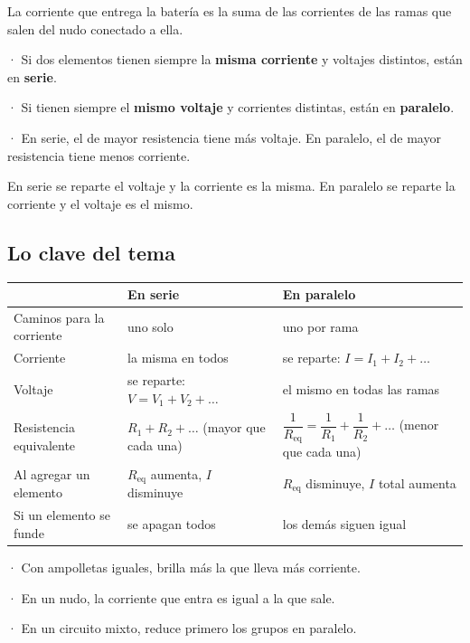 La corriente que entrega la batería es la suma de las corrientes de las ramas que salen del nudo conectado a ella.

  
\begin{clave} · Si dos elementos tienen siempre la \textbf{misma corriente} y voltajes distintos, están en \textbf{serie}.\par · Si tienen siempre el \textbf{mismo voltaje} y corrientes distintas, están en \textbf{paralelo}.\par · En serie, el de mayor resistencia tiene más voltaje. En paralelo, el de mayor resistencia tiene menos corriente.\end{clave}
 
\begin{clave}[{Recuerda}] En serie se reparte el voltaje y la corriente es la misma. En paralelo se reparte la corriente y el voltaje es el mismo.\end{clave}
\subsection{Lo clave del tema}
\begin{center}\small
\begin{tabularx}{\linewidth}{@{}>{\raggedright\arraybackslash\hsize=0.82\hsize}X>{\raggedright\arraybackslash\hsize=0.99\hsize}X>{\raggedright\arraybackslash\hsize=1.19\hsize}X@{}}
\toprule
 & \textbf{En serie} & \textbf{En paralelo} \\
\midrule
Caminos para la corriente & uno solo & uno por rama \\
Corriente & la misma en todos & se reparte: $I = I_1 + I_2 + \dots$ \\
Voltaje & se reparte: $V = V_1 + V_2 + \dots$ & el mismo en todas las ramas \\
Resistencia equivalente & $R_1 + R_2 + \dots$ (mayor que cada una) & $\dfrac{1}{R_{\text{eq}}} = \dfrac{1}{R_1} + \dfrac{1}{R_2} + \dots$ (menor que cada una) \\
Al agregar un elemento & $R_{\text{eq}}$ aumenta, $I$ disminuye & $R_{\text{eq}}$ disminuye, $I$ total aumenta \\
Si un elemento se funde & se apagan todos & los demás siguen igual \\
\bottomrule
\end{tabularx}
\end{center}
 
\begin{clave}[{Recuerda}] · Con ampolletas iguales, brilla más la que lleva más corriente.\par · En un nudo, la corriente que entra es igual a la que sale.\par · En un circuito mixto, reduce primero los grupos en paralelo.\end{clave}
 
